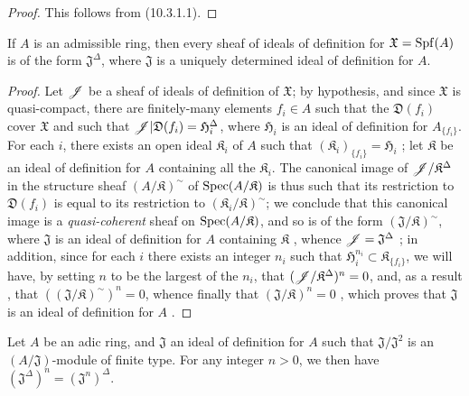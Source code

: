 \begin{proof}
\label{proof-1.10.3.4}
This follows from (10.3.1.1).
\end{proof}

\begin{prop}[10.3.5]
\label{1.10.3.5}
If $A$ is an admissible ring, then every sheaf of ideals of definition for $\mathfrak{X}=\operatorname{Spf}(A)$ is of the form $\mathfrak{J}^\Delta$, where $\mathfrak{J}$ is a uniquely determined ideal of definition for $A$.
\end{prop}

\begin{proof}
\label{proof-1.10.3.5}
Let $\mathscr{J}$ be a sheaf of ideals of definition of $\mathfrak{X}$; by hypothesis, and since $\mathfrak{X}$ is quasi-compact, there are finitely-many elements $f_i\in A$ such that the $\mathfrak{D}(f_i)$ cover $\mathfrak{X}$ and such that $\mathscr{J}|\mathfrak{D}(f_i)=\mathfrak{H}_i^\Delta$, where $\mathfrak{H}_i$ is an ideal of definition for $A_{\{f_i\}}$.
For each $i$, there exists an open ideal $\mathfrak{K}_i$ of $A$ such that $(\mathfrak{K}_i)_{\{f_i\}}=\mathfrak{H}_i$ ; let $\mathfrak{K}$ be an ideal of definition for $A$ containing all the $\mathfrak{K}_i$.
The canonical image of $\mathscr{J}/\mathfrak{K}^\Delta$ in the structure sheaf $(A/\mathfrak{K})^\sim$ of $\operatorname{Spec}(A/\mathfrak{K})$  is thus such that its restriction to $\mathfrak{D}(f_i)$ is equal to its restriction to $(\mathfrak{K}_i/\mathfrak{K})^\sim$;
we conclude that this canonical image is a \emph{quasi-coherent} sheaf on $\operatorname{Spec}(A/\mathfrak{K})$, and so is of the form $(\mathfrak{J}/\mathfrak{K})^\sim$, where $\mathfrak{J}$ is an ideal of definition for $A$ containing $\mathfrak{K}$ , whence $\mathscr{J}=\mathfrak{J}^\Delta$ ;
in addition, since for each $i$ there exists an integer $n_i$ such that $\mathfrak{H}_i^{n_i}\subset\mathfrak{K}_{\{f_i\}}$, we will have, by setting $n$ to be the largest of the $n_i$, that $(\mathscr{J}/\mathfrak{K}^\Delta)^n=0$, and, as a result , that $((\mathfrak{J}/\mathfrak{K})^\sim)^n=0$, whence finally that $(\mathfrak{J}/\mathfrak{K})^n=0$ , which proves that $\mathfrak{J}$ is an ideal of definition for $A$ .
\end{proof}

\begin{prop}[10.3.6]
\label{1.10.3.6}
Let $A$ be an adic ring, and $\mathfrak{J}$ an ideal of definition for $A$ such that $\mathfrak{J}/\mathfrak{J}^2$ is an $(A/\mathfrak{J})$-module of finite type. For any integer $n>0$, we then have $(\mathfrak{J}^\Delta)^n=(\mathfrak{J}^n)^\Delta$.
\end{prop}


